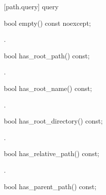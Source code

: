 [path.query]{ query}

\begin{itemdecl}
bool empty() const noexcept;
\end{itemdecl}

\begin{itemdescr}
\pnum
\returns {}.
\end{itemdescr}

\begin{itemdecl}
bool has_root_path() const;
\end{itemdecl}

\begin{itemdescr}
\pnum
\returns {}.
\end{itemdescr}

\begin{itemdecl}
bool has_root_name() const;
\end{itemdecl}

\begin{itemdescr}
\pnum
\returns {}.
\end{itemdescr}

\begin{itemdecl}
bool has_root_directory() const;
\end{itemdecl}

\begin{itemdescr}
\pnum
\returns {}.
\end{itemdescr}

\begin{itemdecl}
bool has_relative_path() const;
\end{itemdecl}

\begin{itemdescr}
\pnum
\returns {}.
\end{itemdescr}

\begin{itemdecl}
bool has_parent_path() const;
\end{itemdecl}

